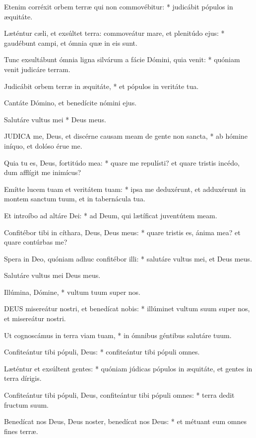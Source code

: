 Etenim corréxit orbem terræ qui non commovébitur: * judicábit pópulos in æquitáte.

Læténtur cæli, et exsúltet terra: commoveátur mare, et plenitúdo ejus: * gaudébunt campi, et ómnia quæ in eis sunt.

Tunc exsultábunt ómnia ligna silvárum a fácie Dómini, quia venit: * quóniam venit judicáre terram.

Judicábit orbem terræ in æquitáte, * et pópulos in veritáte tua.

 Cantáte Dómino, et benedícite nómini ejus.

 Salutáre vultus mei * Deus meus.


\lettrine[lines=2]{J}{UDICA} me, Deus, et discérne causam meam de gente non sancta, * ab hómine iníquo, et dolóso érue me.

Quia tu es, Deus, fortitúdo mea: * quare me repulísti? et quare tristis incédo, dum afflígit me inimícus?

Emítte lucem tuam et veritátem tuam: * ipsa me deduxérunt, et adduxérunt in montem sanctum tuum, et in tabernácula tua.

Et introíbo ad altáre Dei: * ad Deum, qui lætíficat juventútem meam.

Confitébor tibi in cíthara, Deus, Deus meus: * quare tristis es, ánima mea? et quare contúrbas me?

Spera in Deo, quóniam adhuc confitébor illi: * salutáre vultus mei, et Deus meus.

 Salutáre vultus mei Deus meus.

 Illúmina, Dómine, * vultum tuum super nos.


\lettrine[lines=2]{D}{EUS} misereátur nostri, et benedícat nobis: * illúminet vultum suum super nos, et misereátur nostri.

Ut cognoscámus in terra viam tuam, * in ómnibus géntibus salutáre tuum.

Confiteántur tibi pópuli, Deus: * confiteántur tibi pópuli omnes.

Læténtur et exsúltent gentes: * quóniam júdicas pópulos in æquitáte, et gentes in terra dírigis.

Confiteántur tibi pópuli, Deus, confiteántur tibi pópuli omnes: * terra dedit fructum suum.

Benedícat nos Deus, Deus noster, benedícat nos Deus: * et métuant eum omnes fines terræ.

